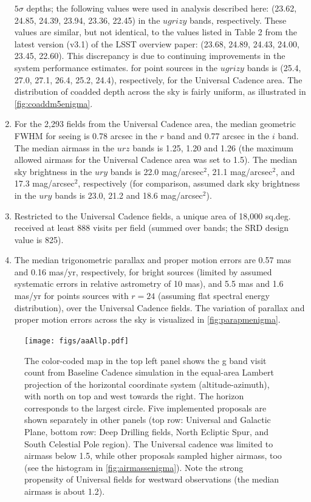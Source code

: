 \begin{enumerate}
{$5\sigma$ depths; the following values were used in analysis described
here: (23.62, 24.85, 24.39, 23.94, 23.36, 22.45) in the $ugrizy$
bands, respectively. These values are similar, but not identical, to the values
listed in Table 2 from the latest version (v3.1) of the LSST overview
paper: (23.68, 24.89, 24.43, 24.00, 23.45, 22.60). This discrepancy
is due to continuing improvements in the system performance estimates.}
for point sources in the $ugrizy$ bands is (25.4, 27.0, 27.1, 26.4,
25.2, 24.4), respectively, for the Universal Cadence area. The distribution 
of coadded depth across the sky is fairly uniform, as illustrated in \autoref{fig:coaddm5enigma}.
\item For the 2,293 fields from the Universal Cadence area, the median
geometric FWHM for seeing is 0.78 arcsec in the $r$ band and 0.77 arcsec 
in the $i$ band. The median airmass in the $urz$ bands is 1.25, 1.20 and 1.26 
(the maximum allowed airmass for the Universal Cadence area was set to
1.5).  The median sky brightness in the $ury$ bands is 22.0 mag/arcsec$^2$, 
21.1 mag/arcsec$^2$, and 17.3 mag/arcsec$^2$, respectively (for comparison,
assumed dark sky brightness in the $ury$ bands is 23.0, 21.2 and 18.6 
mag/arcsec$^2$). 
\item Restricted to the Universal Cadence fields, a unique area of
18,000 sq.deg. received at least 888 visits per field (summed over bands; 
the SRD design value is 825).
\item The median trigonometric parallax and proper motion errors are
0.57 mas and 0.16 mas/yr, respectively, for bright sources (limited by
assumed systematic errors in relative astrometry of 10 mas), and 5.5
mas and 1.6 mas/yr for points sources with $r=24$ (assuming flat
spectral energy distribution), over the Universal Cadence fields. The
variation of parallax and proper motion errors across the sky is
visualized in \autoref{fig:parapmenigma}.
\end{enumerate}


\begin{figure}[t!]
\vskip -3.5in
\hskip -0.5in
\texttt{[image: figs/aaAllp.pdf]}
\vskip -3.5in
\caption{The color-coded map in the top left panel shows the g band visit count from
Baseline Cadence simulation  in the equal-area Lambert projection of the
horizontal coordinate system (altitude-azimuth), with north on top and west towards the
right. The horizon corresponds to the largest circle. Five implemented proposals are shown
separately in other panels (top row: Universal and Galactic Plane, bottom row: Deep Drilling
fields, North Ecliptic Spur, and South Celestial Pole region). The Universal cadence was
limited to airmass below 1.5, while other proposals sampled higher airmass, too (see the
histogram in \autoref{fig:airmassenigma}).  Note the strong propensity of Universal fields
for westward observations (the median airmass is about 1.2).}
\label{fig:AltAzenigma}
\end{figure}

